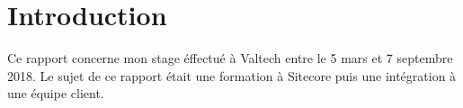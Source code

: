 \section{Introduction}
Ce rapport concerne mon stage éffectué à Valtech entre le 5 mars et 7 septembre 2018.
Le sujet de ce rapport était une formation à Sitecore puis une intégration à une équipe client.
